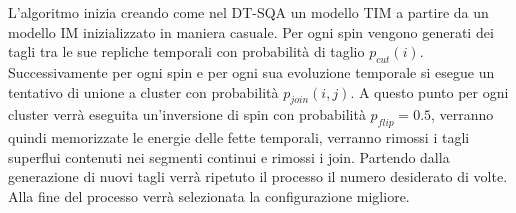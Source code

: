 L'algoritmo inizia creando come nel DT-SQA un modello TIM a partire da un modello IM inizializzato in maniera casuale.
Per ogni spin vengono generati dei tagli tra le sue repliche temporali con probabilità  di taglio $p_{cut}(i)$.
Successivamente per ogni spin e per ogni sua evoluzione temporale si esegue un tentativo di unione a cluster con probabilità $p_{join}(i,j)$.
A questo punto per ogni cluster verrà eseguita un'inversione di spin con probabilità $p_{flip} = 0.5$, verranno quindi memorizzate le energie delle fette temporali, verranno rimossi i tagli superflui contenuti nei segmenti continui e rimossi i join.
Partendo dalla generazione di nuovi tagli verrà ripetuto il processo il numero desiderato di volte.
Alla fine del processo verrà selezionata la configurazione migliore.

